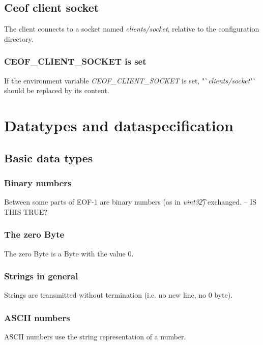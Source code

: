 \documentclass[12pt,a4paper]{article}
\begin{document}
\subsection{Ceof client socket}
The client connects to a socket named \textit{clients/socket}, relative
to the configuration directory.
\subsubsection{CEOF\_CLIENT\_SOCKET is set}
If the environment variable \textit{CEOF\_CLIENT\_SOCKET} is set,
"`\textit{clients/socket}"` should be replaced by its content.
\section{Datatypes and dataspecification}
\subsection{Basic data types}
\subsubsection{Binary numbers}
Between some parts of EOF-1 are binary numbers (as in \textit{uint32\t})
exchanged. -- IS THIS TRUE?
\subsubsection{The zero Byte}
The zero Byte is a Byte with the value 0.
\subsubsection{Strings in general}
Strings are transmitted without termination (i.e. no new line, no 0 byte).
\subsubsection{ASCII numbers}
ASCII numbers use the string representation of a number.
\end{document}
